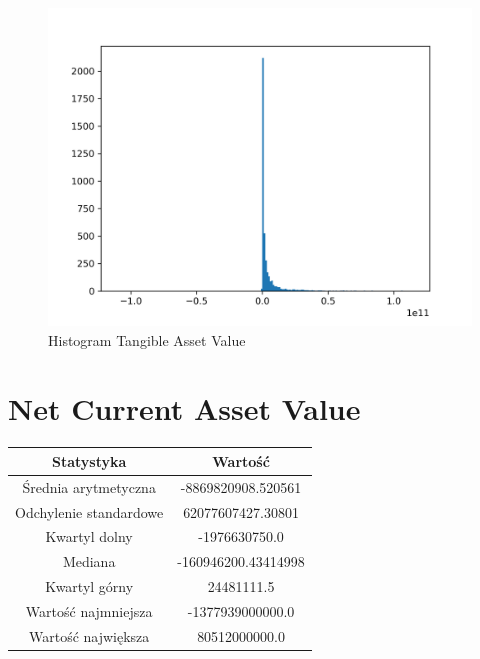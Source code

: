 \documentclass{article}
\begin{document}
\begin{figure}[h!]
    \includegraphics[width=\linewidth]{variables/Tangible Asset Value.png}
    \caption{Histogram Tangible Asset Value }
\end{figure}\section{ Net Current Asset Value }

\begin{center}
    \begin{tabular}{|c | c|} 
    \hline
    Statystyka & Wartość \\
    \hline\hline
    Średnia arytmetyczna & -8869820908.520561 \\ 
    \hline
    Odchylenie standardowe & 62077607427.30801 \\
    \hline
    Kwartyl dolny & -1976630750.0 \\
    \hline
    Mediana & -160946200.43414998 \\
    \hline
    Kwartyl górny & 24481111.5 \\
    \hline
    Wartość najmniejsza & -1377939000000.0 \\
    \hline
    Wartość największa & 80512000000.0 \\
    \hline
   \end{tabular}
\end{center}
\end{document}
